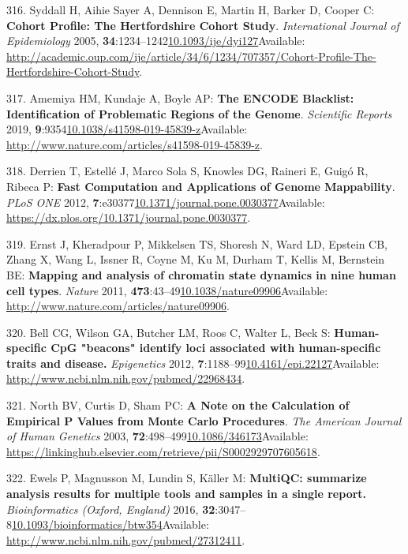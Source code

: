 \documentclass[
]{book}
\begin{document}
\leavevmode\hypertarget{ref-Syddall2005}{}%
316. Syddall H, Aihie Sayer A, Dennison E, Martin H, Barker D, Cooper C: \textbf{Cohort Profile: The Hertfordshire Cohort Study}. \emph{International Journal of Epidemiology} 2005, \textbf{34}:1234--1242\href{https://doi.org/10.1093/ije/dyi127}{10.1093/ije/dyi127}Available: \url{http://academic.oup.com/ije/article/34/6/1234/707357/Cohort-Profile-The-Hertfordshire-Cohort-Study}.

\leavevmode\hypertarget{ref-Amemiya2019}{}%
317. Amemiya HM, Kundaje A, Boyle AP: \textbf{The ENCODE Blacklist: Identification of Problematic Regions of the Genome}. \emph{Scientific Reports} 2019, \textbf{9}:9354\href{https://doi.org/10.1038/s41598-019-45839-z}{10.1038/s41598-019-45839-z}Available: \url{http://www.nature.com/articles/s41598-019-45839-z}.

\leavevmode\hypertarget{ref-Derrien2012}{}%
318. Derrien T, Estellé J, Marco Sola S, Knowles DG, Raineri E, Guigó R, Ribeca P: \textbf{Fast Computation and Applications of Genome Mappability}. \emph{PLoS ONE} 2012, \textbf{7}:e30377\href{https://doi.org/10.1371/journal.pone.0030377}{10.1371/journal.pone.0030377}Available: \url{https://dx.plos.org/10.1371/journal.pone.0030377}.

\leavevmode\hypertarget{ref-Ernst2011}{}%
319. Ernst J, Kheradpour P, Mikkelsen TS, Shoresh N, Ward LD, Epstein CB, Zhang X, Wang L, Issner R, Coyne M, Ku M, Durham T, Kellis M, Bernstein BE: \textbf{Mapping and analysis of chromatin state dynamics in nine human cell types}. \emph{Nature} 2011, \textbf{473}:43--49\href{https://doi.org/10.1038/nature09906}{10.1038/nature09906}Available: \url{http://www.nature.com/articles/nature09906}.

\leavevmode\hypertarget{ref-Bell2012a}{}%
320. Bell CG, Wilson GA, Butcher LM, Roos C, Walter L, Beck S: \textbf{Human-specific CpG "beacons" identify loci associated with human-specific traits and disease.} \emph{Epigenetics} 2012, \textbf{7}:1188--99\href{https://doi.org/10.4161/epi.22127}{10.4161/epi.22127}Available: \url{http://www.ncbi.nlm.nih.gov/pubmed/22968434}.

\leavevmode\hypertarget{ref-North2003}{}%
321. North BV, Curtis D, Sham PC: \textbf{A Note on the Calculation of Empirical P Values from Monte Carlo Procedures}. \emph{The American Journal of Human Genetics} 2003, \textbf{72}:498--499\href{https://doi.org/10.1086/346173}{10.1086/346173}Available: \url{https://linkinghub.elsevier.com/retrieve/pii/S0002929707605618}.

\leavevmode\hypertarget{ref-Ewels2016}{}%
322. Ewels P, Magnusson M, Lundin S, Käller M: \textbf{MultiQC: summarize analysis results for multiple tools and samples in a single report.} \emph{Bioinformatics (Oxford, England)} 2016, \textbf{32}:3047--8\href{https://doi.org/10.1093/bioinformatics/btw354}{10.1093/bioinformatics/btw354}Available: \url{http://www.ncbi.nlm.nih.gov/pubmed/27312411}.
\end{document}
